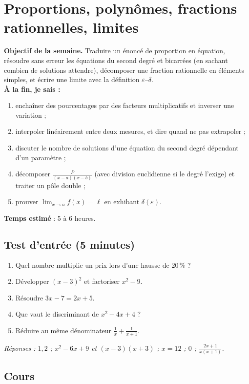 \clearpage
\section{Proportions, polynômes, fractions rationnelles, limites}
\renewcommand{\titrecourant}{Semaine 2}

\begin{boussole}
\textbf{Objectif de la semaine.} Traduire un énoncé de proportion en équation, résoudre sans erreur les équations du second degré et bicarrées (en sachant combien de solutions attendre), décomposer une fraction rationnelle en éléments simples, et écrire une limite avec la définition $\varepsilon$--$\delta$.\\
\textbf{À la fin, je sais :}
\begin{enumerate}
 \item enchaîner des pourcentages par des facteurs multiplicatifs et inverser une variation ;
 \item interpoler linéairement entre deux mesures, et dire quand ne pas extrapoler ;
 \item discuter le nombre de solutions d'une équation du second degré dépendant d'un paramètre ;
 \item décomposer $\frac{P}{(x-a)(x-b)}$ (avec division euclidienne si le degré l'exige) et traiter un pôle double ;
 \item prouver $\lim_{x\to a}f(x)=\ell$ en exhibant $\delta(\varepsilon)$.
\end{enumerate}
\textbf{Temps estimé} : 5 à 6 heures.
\end{boussole}

\subsection{Test d'entrée (5 minutes)}
\begin{enumerate}
 \item Quel nombre multiplie un prix lors d'une hausse de $20\,\%$ ?
 \item Développer $(x-3)^2$ et factoriser $x^2-9$.
 \item Résoudre $3x-7=2x+5$.
 \item Que vaut le discriminant de $x^2-4x+4$ ?
 \item Réduire au même dénominateur $\frac1x+\frac1{x+1}$.
\end{enumerate}
\textit{Réponses : $1{,}2$ ; $x^2-6x+9$ et $(x-3)(x+3)$ ; $x=12$ ; $0$ ; $\frac{2x+1}{x(x+1)}$.}

\subsection{Cours}
